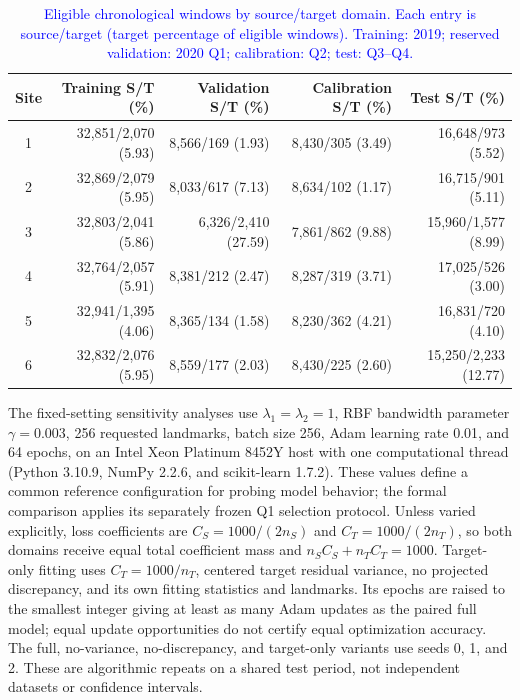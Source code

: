 \begin{table}[pos=htbp]
\centering
\caption{\textcolor{blue}{Eligible chronological windows by source/target domain. Each entry is source/target (target percentage of eligible windows). Training: 2019; reserved validation: 2020 Q1; calibration: Q2; test: Q3--Q4.}}
\label{tab:chronological_counts}
{\color{blue}\small
\begin{tabular}{crrrr}
\toprule
Site & Training S/T (\%) & Validation S/T (\%) & Calibration S/T (\%) & Test S/T (\%) \\
\midrule
1 & 32,851/2,070 (5.93) & 8,566/169 (1.93) & 8,430/305 (3.49) & 16,648/973 (5.52) \\
2 & 32,869/2,079 (5.95) & 8,033/617 (7.13) & 8,634/102 (1.17) & 16,715/901 (5.11) \\
3 & 32,803/2,041 (5.86) & 6,326/2,410 (27.59) & 7,861/862 (9.88) & 15,960/1,577 (8.99) \\
4 & 32,764/2,057 (5.91) & 8,381/212 (2.47) & 8,287/319 (3.71) & 17,025/526 (3.00) \\
5 & 32,941/1,395 (4.06) & 8,365/134 (1.58) & 8,230/362 (4.21) & 16,831/720 (4.10) \\
6 & 32,832/2,076 (5.95) & 8,559/177 (2.03) & 8,430/225 (2.60) & 15,250/2,233 (12.77) \\
\bottomrule
\end{tabular}}
\end{table}

{\color{blue}The fixed-setting sensitivity analyses use $\lambda_1=\lambda_2=1$, RBF bandwidth parameter $\gamma=0.003$, 256 requested landmarks, batch size 256, Adam learning rate 0.01, and 64 epochs, on an Intel Xeon Platinum 8452Y host with one computational thread (Python 3.10.9, NumPy 2.2.6, and scikit-learn 1.7.2). These values define a common reference configuration for probing model behavior; the formal comparison applies its separately frozen Q1 selection protocol. Unless varied explicitly, loss coefficients are $C_S=1000/(2n_S)$ and $C_T=1000/(2n_T)$, so both domains receive equal total coefficient mass and $n_SC_S+n_TC_T=1000$. Target-only fitting uses $C_T=1000/n_T$, centered target residual variance, no projected discrepancy, and its own fitting statistics and landmarks. Its epochs are raised to the smallest integer giving at least as many Adam updates as the paired full model; equal update opportunities do not certify equal optimization accuracy. The full, no-variance, no-discrepancy, and target-only variants use seeds 0, 1, and 2. These are algorithmic repeats on a shared test period, not independent datasets or confidence intervals.}

